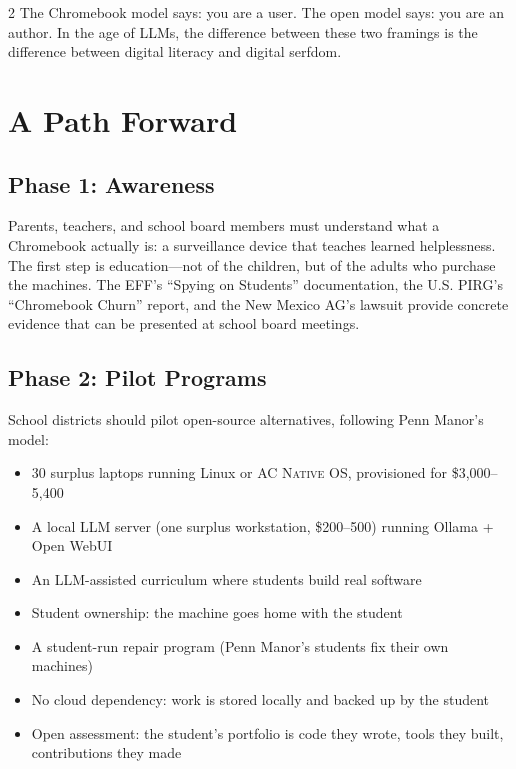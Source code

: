 \documentclass[11pt, a4paper]{article}
\newcommand{\acos}{\textsc{AC Native OS}}
\begin{document}
\begin{multicols}{2}
The Chromebook model says: you are a user. The open model says: you are an author. In the age of LLMs, the difference between these two framings is the difference between digital literacy and digital serfdom.


\section{A Path Forward}

\subsection{Phase 1: Awareness}

Parents, teachers, and school board members must understand what a Chromebook actually is: a surveillance device that teaches learned helplessness. The first step is education---not of the children, but of the adults who purchase the machines. The EFF's ``Spying on Students'' documentation, the U.S. PIRG's ``Chromebook Churn'' report, and the New Mexico AG's lawsuit provide concrete evidence that can be presented at school board meetings.

\subsection{Phase 2: Pilot Programs}

School districts should pilot open-source alternatives, following Penn Manor's model:

\begin{itemize}
  \item 30 surplus laptops running Linux or \acos{}, provisioned for \$3,000--5,400
  \item A local LLM server (one surplus workstation, \$200--500) running Ollama + Open WebUI
  \item An LLM-assisted curriculum where students build real software
  \item Student ownership: the machine goes home with the student
  \item A student-run repair program (Penn Manor's students fix their own machines)
  \item No cloud dependency: work is stored locally and backed up by the student
  \item Open assessment: the student's portfolio is code they wrote, tools they built, contributions they made
\end{itemize}


\end{multicols}
\end{document}
